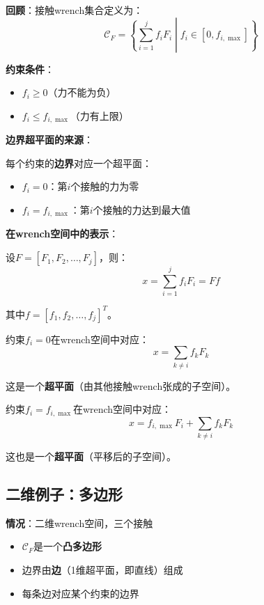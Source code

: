 \documentclass[12pt,a4paper]{article}
\begin{document}
\textbf{回顾}：接触wrench集合定义为：
\begin{equation}
\mathcal{C}_F = \left\{\sum_{i=1}^j f_i F_i \middle| f_i \in [0, f_{i,\max}] \right\}
\end{equation}

\textbf{约束条件}：
\begin{itemize}
\item $f_i \geq 0$（力不能为负）
\item $f_i \leq f_{i,\max}$（力有上限）
\end{itemize}

\textbf{边界超平面的来源}：

每个约束的\textbf{边界}对应一个超平面：
\begin{itemize}
\item $f_i = 0$：第$i$个接触的力为零
\item $f_i = f_{i,\max}$：第$i$个接触的力达到最大值
\end{itemize}

\textbf{在wrench空间中的表示}：

设$F = [F_1, F_2, \ldots, F_j]$，则：
\begin{equation}
x = \sum_{i=1}^j f_i F_i = F f
\end{equation}

其中$f = [f_1, f_2, \ldots, f_j]^T$。

约束$f_i = 0$在wrench空间中对应：
\begin{equation}
x = \sum_{k \neq i} f_k F_k
\end{equation}

这是一个\textbf{超平面}（由其他接触wrench张成的子空间）。

约束$f_i = f_{i,\max}$在wrench空间中对应：
\begin{equation}
x = f_{i,\max} F_i + \sum_{k \neq i} f_k F_k
\end{equation}

这也是一个\textbf{超平面}（平移后的子空间）。

\subsection{二维例子：多边形}

\textbf{情况}：二维wrench空间，三个接触

\begin{itemize}
\item $\mathcal{C}_F$是一个\textbf{凸多边形}
\item 边界由\textbf{边}（1维超平面，即直线）组成
\item 每条边对应某个约束的边界
\end{itemize}
\end{document}
